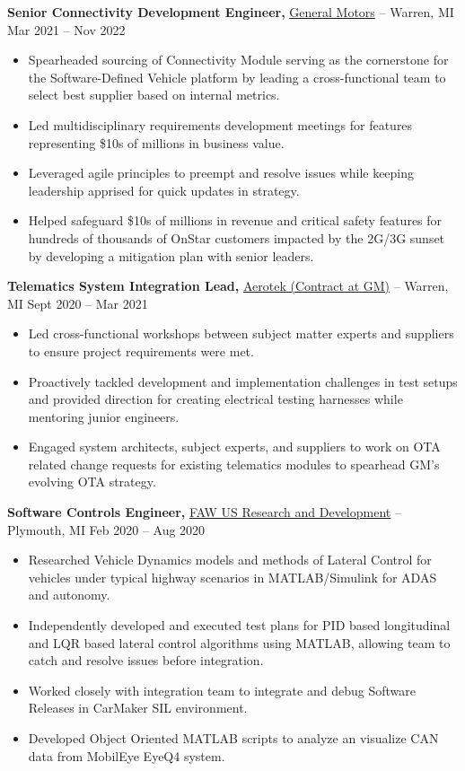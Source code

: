 \documentclass[11pt]{article}       %
\begin{document}
\textbf{Senior Connectivity Development Engineer,} \href{}{General Motors} -- Warren, MI \hfill Mar 2021 -- Nov 2022 \\
\vspace{-9pt}
\begin{itemize}
  \item Spearheaded sourcing of Connectivity Module serving as the cornerstone for the Software-Defined Vehicle platform by leading a cross-functional team to select best supplier based on internal metrics.
  \item Led multidisciplinary requirements development meetings for features representing \$10s of millions in business value.
  \item Leveraged agile principles to preempt and resolve issues while keeping leadership apprised for quick updates in strategy.
  \item Helped safeguard \$10s of millions in revenue and critical safety features for hundreds of thousands of OnStar customers impacted by the 2G/3G sunset by developing a mitigation plan with senior leaders.
\end{itemize}

\textbf{Telematics System Integration Lead,} \href{}{Aerotek (Contract at GM)} -- Warren, MI \hfill Sept 2020 -- Mar 2021 \\
\vspace{-9pt}
\begin{itemize}
  \item Led cross-functional workshops between subject matter experts and suppliers to ensure project requirements were met.
  \item Proactively tackled development and implementation challenges in test setups and provided direction for creating electrical testing harnesses while mentoring junior engineers.
  \item Engaged system architects, subject experts, and suppliers to work on OTA related change requests for existing telematics modules to spearhead GM’s evolving OTA strategy.
\end{itemize}

\textbf{Software Controls Engineer,} \href{}{FAW US Research and Development} -- Plymouth, MI \hfill Feb 2020 -- Aug 2020 \\
\vspace{-9pt}
\begin{itemize}
  \item Researched Vehicle Dynamics models and methods of Lateral Control for vehicles under typical highway scenarios in MATLAB/Simulink for ADAS and autonomy.
  \item Independently developed and executed test plans for PID based longitudinal and LQR based lateral control algorithms using MATLAB, allowing team to catch and resolve issues before integration.
  \item Worked closely with integration team to integrate and debug Software Releases in CarMaker SIL environment.
  \item Developed Object Oriented MATLAB scripts to analyze an visualize CAN data from MobilEye EyeQ4 system.
\end{itemize}
\end{document}
